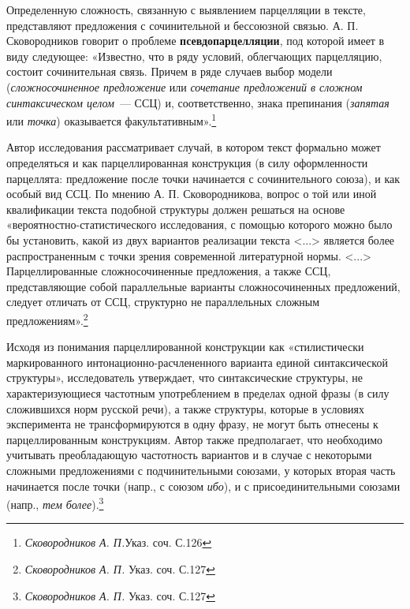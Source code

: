 \documentclass{kursa4}
\begin{document}
      Определенную сложность, связанную с выявлением парцелляции в тексте, представляют
      предложения с сочинительной и бессоюзной связью. А. П. Сковородников
      говорит о проблеме \textbf{псевдопарцелляции}, под которой имеет в виду следующее: «Известно, что в ряду условий, облегчающих парцелляцию, состоит сочинительная связь. Причем в ряде случаев выбор модели (\textit{сложносочиненное предложение} или \textit{сочетание предложений в сложном синтаксическом целом}{~--- ССЦ) и, соответственно, знака препинания (}\textit{запятая} или \textit{точка}) оказывается факультативным».\footnote{\textit{Сковородников А. П.}{Указ. соч. С.126}}

      Автор исследования рассматривает случай, в котором текст формально может определяться и как парцеллированная конструкция (в силу оформленности парцеллята: предложение после точки начинается с сочинительного союза), и как особый вид ССЦ. По мнению А. П.
      Сковородникова, вопрос о той или иной квалификации текста подобной
      структуры должен решаться на основе «вероятностно-статистического
      исследования, с помощью которого можно было бы установить, какой из
      двух вариантов реализации текста \textless{}...\textgreater{} является
      более распространенным с точки зрения современной литературной нормы.
      \textless{}...\textgreater{} Парцеллированные сложносочиненные
      предложения, а также ССЦ, представляющие собой параллельные варианты
      сложносочиненных предложений, следует отличать от
      {ССЦ, структурно не параллельных сложным
      предложениям}{».}\footnote{\textit{{
      Сковородников А. П. }}{Указ. соч.
      С.127}}{ }

      {Исходя из понимания парцеллированной конструкции
      как «стилистически маркированного интонационно-расчлененного варианта
      единой синтаксической структуры», исследователь утверждает, что
      синтаксические структуры, не характеризующиеся частотным употреблением
      в пределах одной фразы (в силу сложившихся норм русской речи), а также
      структуры, которые в условиях эксперимента не трансформируются в одну
      фразу, не могут быть отнесены к парцеллированным конструкциям. Автор
      также предполагает, что необходимо учитывать преобладающую частотность
      вариантов и в случае с некоторыми сложными предложениями с
      подчинительными союзами, у которых вторая часть начинается после точки
      (напр., с союзом }\textit{{ибо}}{), и
      с присоединительными союзами (напр., }\textit{{тем
      более}}{).}\footnote{\textit{{
      Сковородников А. П. }}{Указ. соч. С.127}}
\end{document}
